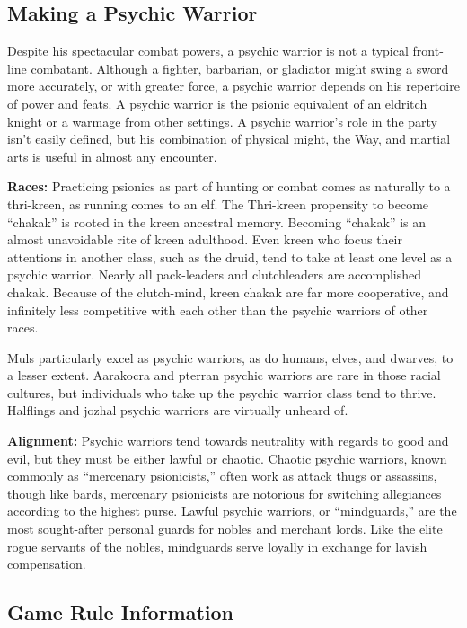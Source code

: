 \subsection{Making a Psychic Warrior}
Despite his spectacular combat powers, a psychic warrior is not a typical front-line combatant. Although a fighter, barbarian, or gladiator might swing a sword more accurately, or with greater force, a psychic warrior depends on his repertoire of power and feats. A psychic warrior is the psionic equivalent of an eldritch knight or a warmage from other settings. A psychic warrior's role in the party isn't easily defined, but his combination of physical might, the Way, and martial arts is useful in almost any encounter.

\textbf{Races:} Practicing psionics as part of hunting or combat comes as naturally to a thri-kreen, as running comes to an elf. The Thri-kreen propensity to become ``chakak'' is rooted in the kreen ancestral memory. Becoming ``chakak'' is an almost unavoidable rite of kreen adulthood. Even kreen who focus their attentions in another class, such as the druid, tend to take at least one level as a psychic warrior. Nearly all pack-leaders and clutchleaders are accomplished chakak. Because of the clutch-mind, kreen chakak are far more cooperative, and infinitely less competitive with each other than the psychic warriors of other races.

Muls particularly excel as psychic warriors, as do humans, elves, and dwarves, to a lesser extent. Aarakocra and pterran psychic warriors are rare in those racial cultures, but individuals who take up the psychic warrior class tend to thrive. Halflings and jozhal psychic warriors are virtually unheard of.

\textbf{Alignment:} Psychic warriors tend towards neutrality with regards to good and evil, but they must be either lawful or chaotic. Chaotic psychic warriors, known commonly as ``mercenary psionicists,'' often work as attack thugs or assassins, though like bards, mercenary psionicists are notorious for switching allegiances according to the highest purse. Lawful psychic warriors, or ``mindguards,'' are the most sought-after personal guards for nobles and merchant lords. Like the elite rogue servants of the nobles, mindguards serve loyally in exchange for lavish compensation.

\subsection{Game Rule Information}

